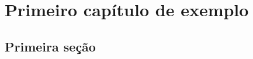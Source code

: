 \chapter{Primeiro capítulo de exemplo}
\label{cap1}

\vspace{-1.9cm}







\section{Primeira seção}
\label{secao1}


